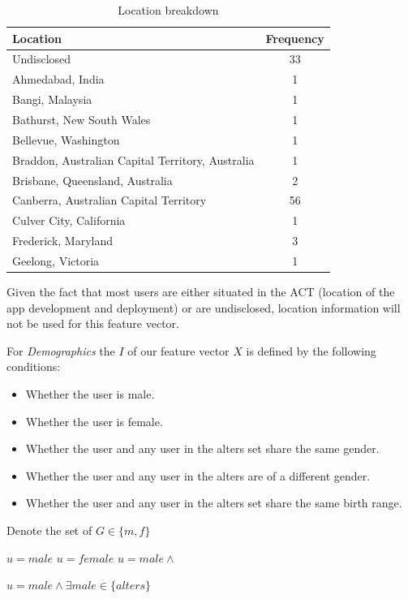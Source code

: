 \begin{table}[!htbp]
\centering
	\begin{tabular}{|l|c|} %
		\hline
		\textbf{Location} & \textbf{Frequency}  \\ \hline
		Undisclosed & 33 \\ \hline
		Ahmedabad, India & 1 \\ \hline
		Bangi, Malaysia & 1 \\ \hline
		Bathurst, New South Wales & 1 \\ \hline
		Bellevue, Washington & 1 \\ \hline
		Braddon, Australian Capital Territory, Australia & 1 \\ \hline
		Brisbane, Queensland, Australia & 2 \\ \hline
		Canberra, Australian Capital Territory & 56 \\ \hline
		Culver City, California & 1 \\ \hline
		Frederick, Maryland & 3 \\ \hline
		Geelong, Victoria & 1 \\ \hline
	\end{tabular}
	\caption{Location breakdown}
	\label{tab:revpol}
\end{table}

Given the fact that most users are either situated in the ACT (location of the app development and deployment) or are undisclosed, 
location information will not be used for this feature vector.

For \emph{Demographics} the $I$ of our feature vector $X$ is defined by the following conditions:
\begin{itemize}
\item Whether the user is male.
\item Whether the user is female.
\item Whether the user and any user in the alters set share the same gender.
\item Whether the user and any user in the alters are of a different gender.
\item Whether the user and any user in the alters set share the same birth range.
\end{itemize}




Denote the set of 
$G \in \{m,f\}$

$u = male$
$u = female$
$u = male \land $

$u = male \land \exists male \in \{alters\}$

